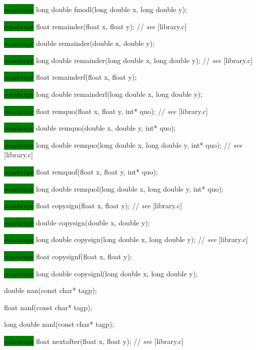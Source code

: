 \documentclass[prd,twocolumn,amsmath,amssymb,nofootinbib,eqsecnum]{revtex4-1}
\newcommand{\highlight}[1]{\colorbox{green}{\!\!\!\! #1}}
\newcommand{\stdcomment}[1]{{// {\it see} [#1]}}
\begin{document}
{\highlight{constexpr} long double fmodl(long double x, long double y);

\vspace{2ex}

\highlight{constexpr} float remainder(float x, float y); \stdcomment{library.c}

\highlight{constexpr} double remainder(double x, double y);

\highlight{constexpr} long double remainder(long double x, long double y); \stdcomment{library.c}

\highlight{constexpr} float remainderf(float x, float y);

\highlight{constexpr} long double remainderl(long double x, long double y);

\vspace{2ex}

\highlight{constexpr}  float remquo(float x, float y, int* quo); \stdcomment{library.c}

\highlight{constexpr}  double remquo(double x, double y, int* quo);

\highlight{constexpr}  long double remquo(long double x, long double y, int* quo); \stdcomment{library.c}

\highlight{constexpr}  float remquof(float x, float y, int* quo);

\highlight{constexpr}  long double remquol(long double x, long double y, int* quo);

\vspace{2ex}

\highlight{constexpr} float copysign(float x, float y); \stdcomment{library.c}

\highlight{constexpr} double copysign(double x, double y);

\highlight{constexpr} long double copysign(long double x, long double y); \stdcomment{library.c}

\highlight{constexpr} float copysignf(float x, float y);

\highlight{constexpr} long double copysignl(long double x, long double y);

\vspace{2ex}

double nan(const char* tagp);

float nanf(const char* tagp);

long double nanl(const char* tagp);

\vspace{2ex}

\highlight{constexpr}  float nextafter(float x, float y); \stdcomment{library.c}

}
\end{document}
